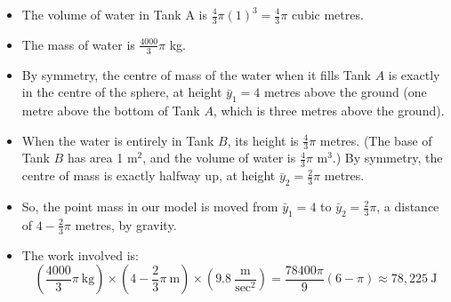 \begin{solution}
\begin{itemize}
\item
The volume of water in Tank A is $\frac{4}{3}\pi(1)^3 = \frac{4}{3}\pi$ cubic metres.
\item The mass of water is $\frac{4000}{3}\pi$ kg.
\item By symmetry, the centre of mass of the water when it fills Tank $A$ is exactly in the centre of the sphere, at height $\bar y_1=4$ metres above the ground (one metre above the bottom of Tank $A$, which is three metres above the ground).
\item When the water is entirely in Tank $B$, its height is $\frac{4}{3}\pi$ metres. (The base of Tank $B$ has area 1 m$^2$, and the volume of water is $\frac{4}{3}\pi$ m$^3$.) By symmetry, the centre of mass is exactly halfway up, at height $\bar y_2=\frac{2}{3}\pi$ metres.
\item So, the point mass in our model is moved from $\bar y_1=4$ to $\bar y_2=\frac{2}{3}\pi$, a distance of $4-\frac{2}{3}\pi$ metres, by gravity.
\item The work involved is:
\[\left(\frac{4000}{3}\pi~\text{kg}\right)\times\left(4-\frac{2}{3}\pi~\text{m}\right)\times\left(9.8~\frac{\text{m}}{\text{sec}^2}\right) = \frac{78400\pi}{9}(6-\pi)\approx 78,225~\text{J}\]
\end{itemize}
\end{solution}


